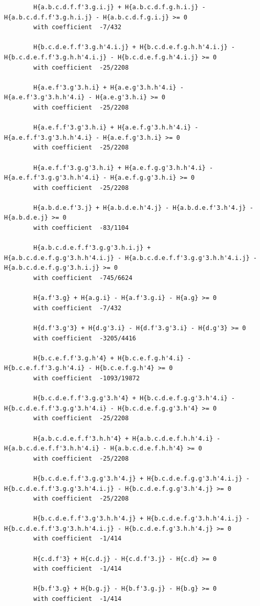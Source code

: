 \documentclass[11pt, a4paper]{kybernetika}
\begin{document}
\begin{verbatim}
		H{a.b.c.d.f.f'3.g.i.j} + H{a.b.c.d.f.g.h.i.j} - H{a.b.c.d.f.f'3.g.h.i.j} - H{a.b.c.d.f.g.i.j} >= 0
		with coefficient  -7/432
		
		H{b.c.d.e.f.f'3.g.h'4.i.j} + H{b.c.d.e.f.g.h.h'4.i.j} - H{b.c.d.e.f.f'3.g.h.h'4.i.j} - H{b.c.d.e.f.g.h'4.i.j} >= 0
		with coefficient  -25/2208
		
		H{a.e.f'3.g'3.h.i} + H{a.e.g'3.h.h'4.i} - H{a.e.f'3.g'3.h.h'4.i} - H{a.e.g'3.h.i} >= 0
		with coefficient  -25/2208
		
		H{a.e.f.f'3.g'3.h.i} + H{a.e.f.g'3.h.h'4.i} - H{a.e.f.f'3.g'3.h.h'4.i} - H{a.e.f.g'3.h.i} >= 0
		with coefficient  -25/2208
		
		H{a.e.f.f'3.g.g'3.h.i} + H{a.e.f.g.g'3.h.h'4.i} - H{a.e.f.f'3.g.g'3.h.h'4.i} - H{a.e.f.g.g'3.h.i} >= 0
		with coefficient  -25/2208
		
		H{a.b.d.e.f'3.j} + H{a.b.d.e.h'4.j} - H{a.b.d.e.f'3.h'4.j} - H{a.b.d.e.j} >= 0
		with coefficient  -83/1104
		
		H{a.b.c.d.e.f.f'3.g.g'3.h.i.j} + H{a.b.c.d.e.f.g.g'3.h.h'4.i.j} - H{a.b.c.d.e.f.f'3.g.g'3.h.h'4.i.j} - H{a.b.c.d.e.f.g.g'3.h.i.j} >= 0
		with coefficient  -745/6624
		
		H{a.f'3.g} + H{a.g.i} - H{a.f'3.g.i} - H{a.g} >= 0
		with coefficient  -7/432
		
		H{d.f'3.g'3} + H{d.g'3.i} - H{d.f'3.g'3.i} - H{d.g'3} >= 0
		with coefficient  -3205/4416
		
		H{b.c.e.f.f'3.g.h'4} + H{b.c.e.f.g.h'4.i} - H{b.c.e.f.f'3.g.h'4.i} - H{b.c.e.f.g.h'4} >= 0
		with coefficient  -1093/19872
		
		H{b.c.d.e.f.f'3.g.g'3.h'4} + H{b.c.d.e.f.g.g'3.h'4.i} - H{b.c.d.e.f.f'3.g.g'3.h'4.i} - H{b.c.d.e.f.g.g'3.h'4} >= 0
		with coefficient  -25/2208
		
		H{a.b.c.d.e.f.f'3.h.h'4} + H{a.b.c.d.e.f.h.h'4.i} - H{a.b.c.d.e.f.f'3.h.h'4.i} - H{a.b.c.d.e.f.h.h'4} >= 0
		with coefficient  -25/2208
		
		H{b.c.d.e.f.f'3.g.g'3.h'4.j} + H{b.c.d.e.f.g.g'3.h'4.i.j} - H{b.c.d.e.f.f'3.g.g'3.h'4.i.j} - H{b.c.d.e.f.g.g'3.h'4.j} >= 0
		with coefficient  -25/2208
		
		H{b.c.d.e.f.f'3.g'3.h.h'4.j} + H{b.c.d.e.f.g'3.h.h'4.i.j} - H{b.c.d.e.f.f'3.g'3.h.h'4.i.j} - H{b.c.d.e.f.g'3.h.h'4.j} >= 0
		with coefficient  -1/414
		
		H{c.d.f'3} + H{c.d.j} - H{c.d.f'3.j} - H{c.d} >= 0
		with coefficient  -1/414
		
		H{b.f'3.g} + H{b.g.j} - H{b.f'3.g.j} - H{b.g} >= 0
		with coefficient  -1/414
		

\end{verbatim}
\end{document}
